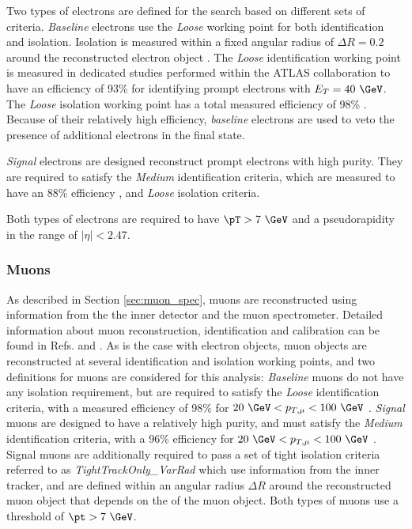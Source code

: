 Two types of electrons are defined for the search based on different sets of criteria.
\emph{Baseline} electrons use the \emph{Loose} working point for both identification and isolation. Isolation is measured within a fixed angular radius of \(\Delta R=0.2\) around the reconstructed electron object \cite{PERF-2017-01}. The \emph{Loose} identification working point is measured in dedicated studies performed within the ATLAS collaboration to have an efficiency of 93\% \cite{PERF-2017-01} for identifying prompt electrons with \(E_T=40~\GeV\). The \emph{Loose} isolation working point has a total measured efficiency of 98\% \cite{PERF-2017-01}. Because of their relatively high efficiency, \emph{baseline} electrons are used to veto the presence of additional electrons in the final state.

\emph{Signal} electrons are designed reconstruct prompt electrons with high purity. They are required to satisfy the \emph{Medium} identification criteria, which are measured to have an 88\% efficiency \cite{PERF-2017-01}, and \emph{Loose} isolation criteria.

Both types of electrons are required to have \(\pT > 7~\GeV\) and a pseudorapidity in the range of \(|\eta| < 2.47\).

\subsubsection{Muons}

As described in Section \ref{sec:muon_spec}, muons are reconstructed using information from the the inner detector and the muon spectrometer. Detailed information about muon reconstruction, identification and calibration can be found in Refs. \cite{PERF-2015-10} and \cite{ATL-PHYS-PROC-2018-052}. As is the case with electron objects, muon objects are reconstructed at several identification and isolation working points, and two definitions for muons are considered for this analysis:
\newline \emph{Baseline} muons do not have any isolation requirement, but are required to satisfy the \emph{Loose} identification criteria, with a measured efficiency of 98\% for \(20~\GeV<p_{T, \mu}<100~\GeV\) \cite{PERF-2015-10}.
\newline \emph{Signal} muons are designed to have a relatively high purity, and must satisfy the \emph{Medium} identification criteria, with a 96\% efficiency for \(20~\GeV<p_{T, \mu}<100~\GeV\) \cite{PERF-2015-10}. Signal muons are additionally required to pass a set of tight isolation criteria referred to as \emph{TightTrackOnly\_VarRad} \cite{ATL-PHYS-PROC-2018-052} which use information from the inner tracker, and are defined within an angular radius \(\Delta R\) around the reconstructed muon object that depends on the \pt of the muon object.
\newline Both types of muons use a threshold of \(\pt > 7~\GeV \). 

